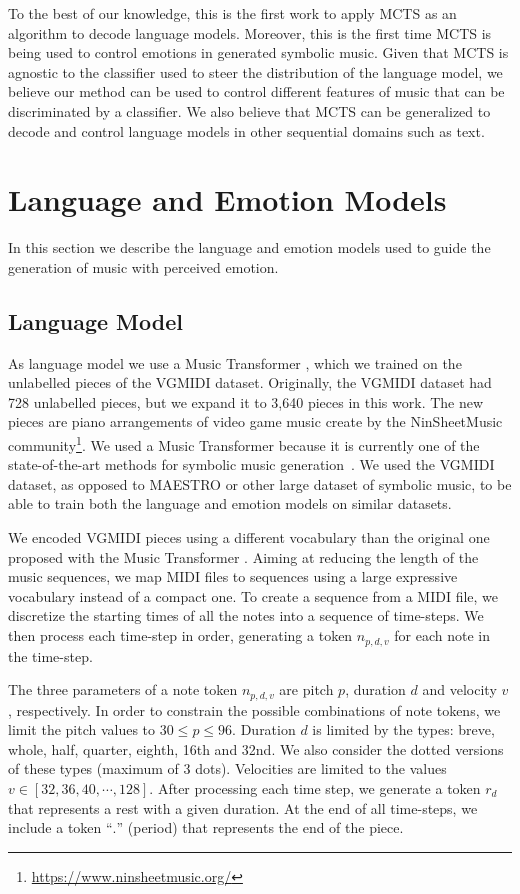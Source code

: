 To the best of our knowledge, this is the first work to apply MCTS as an algorithm to decode language models. Moreover, this is the first time MCTS is being used to control emotions in generated symbolic music. Given that MCTS is agnostic to the classifier used to steer the distribution of the language model, we believe our method can be used to control different features of music that can be discriminated by a classifier. We also believe that MCTS can be generalized to decode and control language models in other sequential domains such as text.

\section{Language and Emotion Models}

In this section we describe the language and emotion models used to guide the generation of music with perceived emotion.

\subsection{Language Model}

As language model we use a Music Transformer \cite{huang2018music}, which we trained on the unlabelled pieces of the VGMIDI dataset. Originally, the VGMIDI dataset had 728 unlabelled pieces, but we expand it to 3,640 pieces in this work. The new pieces are piano arrangements of video game music create by the NinSheetMusic community\footnote{\url{https://www.ninsheetmusic.org/}}. We used
a Music Transformer because it is currently one of the state-of-the-art methods for symbolic music generation~\cite{huang2018music}. We used the VGMIDI dataset, as opposed to
MAESTRO \cite{hawthorne2018enabling} or other large dataset of symbolic music, to be able to train both the language and emotion models on similar datasets.

We encoded VGMIDI pieces using a different vocabulary than the original one proposed with the Music Transformer \cite{huang2018music}. Aiming at reducing the length of the music sequences, we map MIDI files to sequences using a large expressive vocabulary
instead of a compact one. To create a sequence from a MIDI file, we
discretize the starting times of all the notes into a sequence of time-steps. We then process each time-step in order, generating a token $n_{p, d, v}$ for each note in the time-step.

The three parameters of a note token $n_{p, d, v}$ are pitch $p$, duration $d$ and velocity $v$, respectively. In order to constrain the possible combinations of note tokens, we limit the pitch values to $30 \leq p \leq 96$. Duration $d$ is limited by the types: breve, whole, half, quarter, eighth, 16th and 32nd. We also
consider the dotted versions of these types (maximum of 3 dots).
Velocities are limited to the values $v \in [32, 36, 40, \cdots, 128]$.
After processing each time step, we generate a token $r_d$ that represents a rest with a given duration. At the end of all time-steps, we include a token ``$.$'' (period) that represents the end of the piece.

